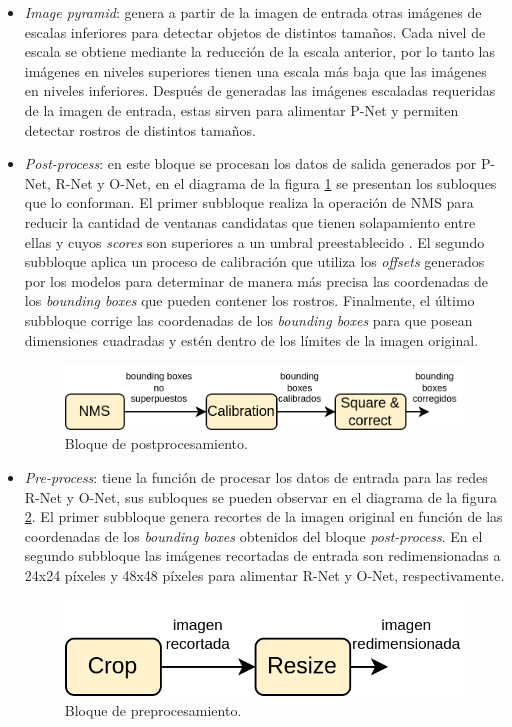 \begin{itemize}
	\item \textit{Image pyramid}: genera a partir de la imagen de entrada otras imágenes de escalas inferiores para detectar objetos de distintos tamaños. Cada nivel de escala se obtiene mediante la reducción de la escala anterior, por lo tanto las imágenes en niveles superiores tienen una escala más baja que las imágenes en niveles inferiores. Después de generadas las imágenes escaladas requeridas de la imagen de entrada, estas sirven para alimentar P-Net y permiten detectar rostros de distintos tamaños.

	\item \textit{Post-process}: en este bloque se procesan los datos de salida generados por P-Net, R-Net y O-Net, en el diagrama de la figura \ref{fig:mtcnn_postprocess} se presentan los subloques que lo conforman. El primer subbloque realiza la operación de NMS para reducir la cantidad de ventanas candidatas que tienen solapamiento entre ellas y cuyos \textit{scores} son superiores a un umbral preestablecido . El segundo subbloque aplica un proceso de calibración que utiliza los \textit{offsets} generados por los modelos para determinar de manera más precisa las coordenadas de los \textit{bounding boxes} que pueden contener los rostros. Finalmente, el último subbloque corrige las coordenadas de los \textit{bounding boxes} para que posean dimensiones cuadradas y estén dentro de los límites de la imagen original.
	\begin{figure}[h]
		\centering
		\includegraphics[scale=0.3]{./Figures/mtcnn_postprocess.png}
		\caption{Bloque de postprocesamiento.}
		\label{fig:mtcnn_postprocess}
	\end{figure}
	
	\item \textit{Pre-process}: tiene la función de procesar los datos de entrada para las redes R-Net y O-Net, sus subloques se pueden observar en el diagrama de la figura \ref{fig:mtcnn_preprocess}. El primer subbloque genera recortes de la imagen original en función de las coordenadas de los \textit{bounding boxes} obtenidos del bloque \textit{post-process}. En el segundo subbloque las imágenes recortadas de entrada son redimensionadas a 24x24 píxeles y 48x48 píxeles para alimentar R-Net y O-Net, respectivamente.
	\begin{figure}[h]
		\centering
		\includegraphics[scale=0.3]{./Figures/mtcnn_preprocess.png}
		\caption{Bloque de preprocesamiento.}
		\label{fig:mtcnn_preprocess}
	\end{figure}

\end{itemize}

